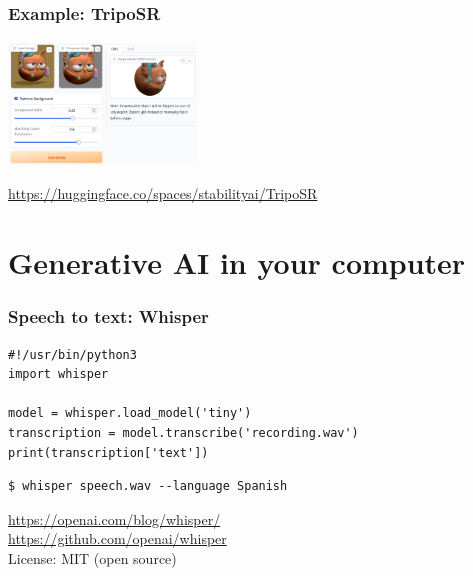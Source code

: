 \documentclass[17pt,aspectratio=169,hyperref={pdfusetitle,colorlinks,allcolors=olive}]{beamer}
\begin{document}
\begin{frame}[fragile]
\frametitle{Example: TripoSR}

\begin{center}
  \includegraphics[width=5cm]{figs/triposr}
\end{center}

\begin{flushright}
  {\small
    \url{https://huggingface.co/spaces/stabilityai/TripoSR}
  }
\end{flushright}
\end{frame}

\section{Generative AI in your computer}

\begin{frame}[fragile]
  \frametitle{Speech to text: Whisper}

{\small
\begin{verbatim}
#!/usr/bin/python3
import whisper

model = whisper.load_model('tiny')
transcription = model.transcribe('recording.wav')
print(transcription['text'])
\end{verbatim}
}

\begin{verbatim}
$ whisper speech.wav --language Spanish
\end{verbatim}

\begin{flushright}
  {\scriptsize
    \url{https://openai.com/blog/whisper/} \\
    \url{https://github.com/openai/whisper} \\
    License: MIT (open source) \\
  }
\end{flushright}

\end{frame}
\end{document}
